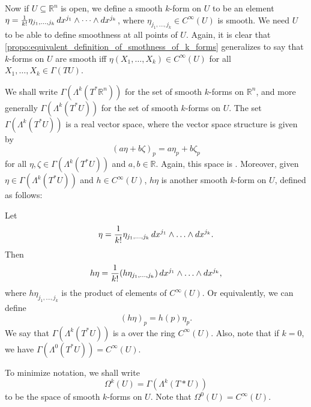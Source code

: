\documentclass[notoc,notitlepage]{tufte-book}
\begin{document}
Now if $U \subseteq \mathbb{R}^n$ is open, we define a smooth $k$-form on $U$ to be an element
$\eta = \frac{1}{k!} \eta_{j_1, \ldots, j_k} \mathop{}\!d{x^{j_1}} \land \dots \land \mathop{}\!d{x^{j_k}}$, where
$\eta_{j_1, \ldots, j_k} \in C^\infty(U)$ is smooth. We need $U$ to be able to define smoothness
at all points of $U$. Again, it is clear that 
\cref{propo:equivalent_definition_of_smothness_of_k_forms} generalizes to say that $k$-forms on $U$
are smooth iff $\eta(X_1, \ldots, X_k) \in C^\infty(U)$ for all $X_1, \ldots, X_k \in \Gamma(TU)$.

We shall write $\Gamma(\Lambda^k(T^* \mathbb{R}^n))$ for the set of smooth $k$-forms on 
$\mathbb{R}^n$, and more generally $\Gamma(\Lambda^k(T^* U))$ for the set of smooth $k$-forms
on $U$. The set $\Gamma(\Lambda^k(T^* U))$ is a real vector space, where the vector space structure
is given by
\begin{equation*}
  (a \eta + b \zeta)_p = a \eta_p + b \zeta_p
\end{equation*}
for all $\eta, \zeta \in \Gamma(\Lambda^k(T^* U))$ and $a, b \in \mathbb{R}$. Again, this space is
. Moreover, given $\eta \in \Gamma(\Lambda^k(T^* U))$ and 
$h \in C^\infty(U)$, $h \eta$ is another smooth $k$-form on $U$, defined as follows:

Let
\begin{equation*}
  \eta = \frac{1}{k!} \eta_{j_1, \ldots, j_k} \mathop{}\!d{x^{j_1}} \land \hdots \land \mathop{}\!d{x^{j_k}}.
\end{equation*}
Then
\begin{equation*}
  h \eta = \frac{1}{k!} (h\eta_{j_1, \ldots, j_k}) \mathop{}\!d{x^{j_1}} \land \hdots \land \mathop{}\!d{x^{j_k}},
\end{equation*}
where $h\eta_{j_1, \ldots, j_k}$ is the product of elements of $C^{\infty}(U)$. Or equivalently,
we can define
\begin{equation}\label{eq:k_form_with_scalar}
  (h \eta)_p = h(p) \eta_p.
\end{equation}
We say that $\Gamma(\Lambda^k(T^* U))$ is a  over the ring $C^\infty(U)$. Also,
note that if $k = 0$, we have $\Gamma(\Lambda^0(T^* U)) = C^\infty(U)$.

\begin{note}[Notation]
  To minimize notation, we shall write
  \begin{equation*}
    \Omega^k(U) = \Gamma(\Lambda^k(T*U))
  \end{equation*}
  to be the space of smooth $k$-forms on $U$. Note that $\Omega^0(U) = C^\infty(U)$.
\end{note}
\end{document}
